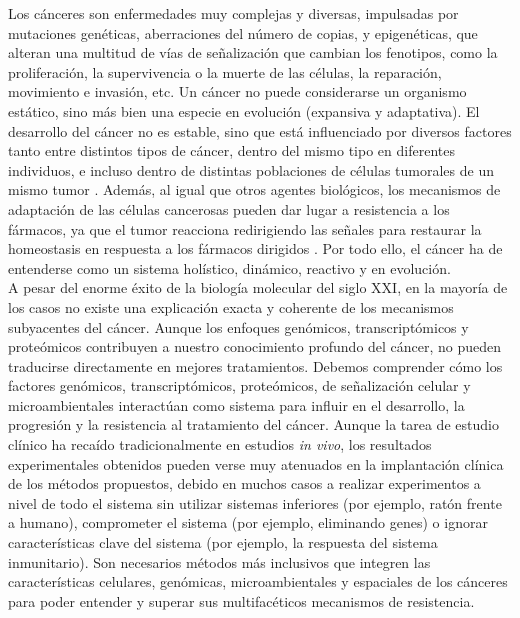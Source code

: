 Los cánceres son enfermedades muy complejas y diversas, impulsadas por mutaciones genéticas, aberraciones del número de copias, y epigenéticas, que alteran una multitud de vías de señalización que cambian los fenotipos, como la proliferación, la supervivencia o la muerte de las células, la reparación, movimiento e invasión, etc. Un cáncer no puede considerarse un organismo estático, sino más bien una especie en evolución (expansiva y adaptativa). El desarrollo del cáncer no es estable, sino que está influenciado por diversos factores tanto entre distintos tipos de cáncer, dentro del mismo tipo en diferentes individuos, e incluso dentro de distintas poblaciones de células tumorales de un mismo tumor \cite{Gerlinger2014, Tabassum2015}. Además, al igual que otros agentes biológicos, los mecanismos de adaptación de las células cancerosas pueden dar lugar a resistencia a los fármacos, ya que el tumor reacciona redirigiendo las señales para restaurar la homeostasis en respuesta a los fármacos dirigidos \cite{Hartman2001, Morken2014, Echeverria2019}. Por todo ello,  el cáncer ha de entenderse como un sistema holístico, dinámico, reactivo y en evolución.\\

A pesar del enorme éxito de la biología molecular del siglo XXI, en la mayoría de los casos no existe una explicación exacta y coherente de los mecanismos subyacentes del cáncer. Aunque los enfoques genómicos, transcriptómicos y proteómicos contribuyen a nuestro conocimiento profundo del cáncer, no pueden traducirse directamente en mejores tratamientos. Debemos comprender cómo los factores genómicos, transcriptómicos, proteómicos, de señalización celular y microambientales interactúan como sistema para influir en el desarrollo, la progresión y la resistencia al tratamiento del cáncer. Aunque la tarea de estudio clínico ha recaído tradicionalmente en estudios \textit{in vivo}, los resultados experimentales obtenidos pueden verse muy atenuados en la implantación clínica de los métodos propuestos, debido en muchos casos a realizar experimentos a nivel de todo el sistema sin utilizar sistemas inferiores (por ejemplo, ratón frente a humano), comprometer el sistema (por ejemplo, eliminando genes) o ignorar características clave del sistema (por ejemplo, la respuesta del sistema inmunitario). Son necesarios métodos más inclusivos que integren las características celulares, genómicas, microambientales y espaciales de los cánceres para poder entender y superar sus multifacéticos mecanismos de resistencia.\\ 

